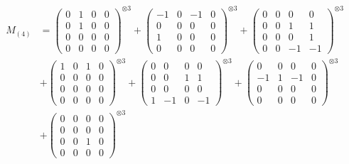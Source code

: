 \documentclass{article}
\newcommand{\Mthree}{%
    M_{(4)}
}
\begin{document}
        \newpage
        
        \footnotesize{
        \begin{align}
        \Mthree
        &= \label{Rs16-Rc11-Solution-3-c1} \begin{pmatrix} 0 & 1 & 0 & 0 \\ 0 & 1 & 0 & 0 \\ 0 & 0 & 0 & 0 \\ 0 & 0 & 0 & 0 \end{pmatrix}^{\otimes 3} 
            + \begin{pmatrix} -1 & 0 & -1 & 0 \\ 0 & 0 & 0 & 0 \\ 1 & 0 & 0 & 0 \\ 0 & 0 & 0 & 0 \end{pmatrix}^{\otimes 3} 
            + \begin{pmatrix} 0 & 0 & 0 & 0 \\ 0 & 0 & 1 & 1 \\ 0 & 0 & 0 & 1 \\ 0 & 0 & -1 & -1 \end{pmatrix}^{\otimes 3} \\
        &+ \label{Rs16-Rc11-Solution-3-c4} \begin{pmatrix} 1 & 0 & 1 & 0 \\ 0 & 0 & 0 & 0 \\ 0 & 0 & 0 & 0 \\ 0 & 0 & 0 & 0 \end{pmatrix}^{\otimes 3} 
            + \begin{pmatrix} 0 & 0 & 0 & 0 \\ 0 & 0 & 1 & 1 \\ 0 & 0 & 0 & 0 \\ 1 & -1 & 0 & -1 \end{pmatrix}^{\otimes 3} 
            + \begin{pmatrix} 0 & 0 & 0 & 0 \\ -1 & 1 & -1 & 0 \\ 0 & 0 & 0 & 0 \\ 0 & 0 & 0 & 0 \end{pmatrix}^{\otimes 3} \\
        &+ \label{Rs16-Rc11-Solution-3-c7} \begin{pmatrix} 0 & 0 & 0 & 0 \\ 0 & 0 & 0 & 0 \\ 0 & 0 & 1 & 0 \\ 0 & 0 & 0 & 0 \end{pmatrix}^{\otimes 3} 

\end{align}}
\end{document}
